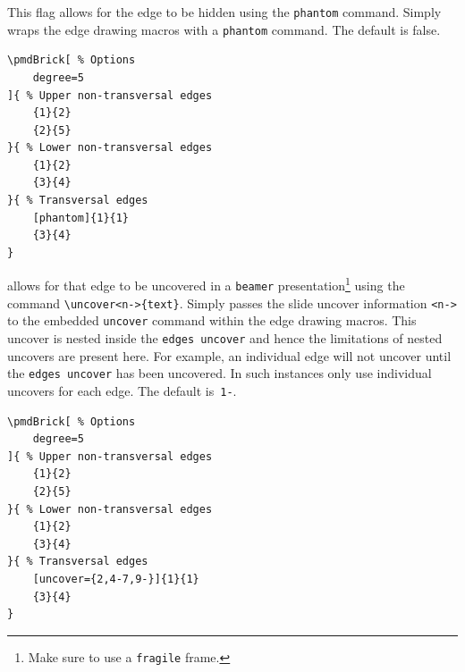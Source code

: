 \documentclass{ltxdoc}
\begin{document}
This flag allows for the edge to be hidden using the \texttt{phantom} command. Simply wraps the edge drawing macros with a \texttt{phantom} command. The default is false.
\begin{center}
    \begin{minipage}{\dimexpr0.85\textwidth-2\fboxrule-2\fboxsep\relax}
        \begin{minipage}[c]{0.4\linewidth}
\begin{verbatim}
\pmdBrick[ % Options
    degree=5
]{ % Upper non-transversal edges
    {1}{2}
    {2}{5}
}{ % Lower non-transversal edges
    {1}{2}
    {3}{4}
}{ % Transversal edges
    [phantom]{1}{1}
    {3}{4}
}
\end{verbatim}
        \end{minipage}
        \hfill
        \begin{minipage}[c]{0.4\linewidth}
        \end{minipage}
    \end{minipage}%
\end{center}

allows for that edge to be uncovered in a \texttt{beamer} presentation\footnote{Make sure to use a \texttt{fragile} frame.} using the command \verb`\uncover<n->{text}`. Simply passes the slide uncover information \verb`<n->` to the embedded \texttt{uncover} command within the edge drawing macros. This uncover is nested inside the \texttt{edges uncover} and hence the limitations of nested uncovers are present here. For example, an individual edge will not uncover until the \texttt{edges uncover} has been uncovered. In such instances only use individual uncovers for each edge. The default is~\texttt{1-}.
\begin{center}
    \begin{minipage}{\dimexpr0.85\textwidth-2\fboxrule-2\fboxsep\relax}
        \begin{minipage}[c]{0.4\linewidth}
\begin{verbatim}
\pmdBrick[ % Options
    degree=5
]{ % Upper non-transversal edges
    {1}{2}
    {2}{5}
}{ % Lower non-transversal edges
    {1}{2}
    {3}{4}
}{ % Transversal edges
    [uncover={2,4-7,9-}]{1}{1}
    {3}{4}
}
\end{verbatim}
        \end{minipage}
        \hfill
        \begin{minipage}[c]{0.4\linewidth}
        \end{minipage}
    \end{minipage}%
\end{center}
\end{document}
